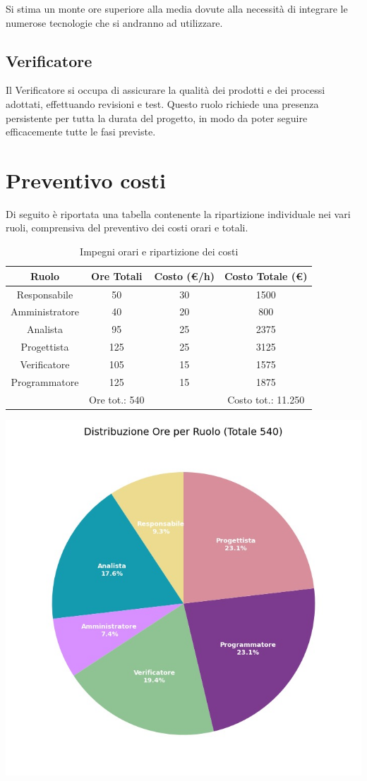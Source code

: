 \documentclass{article}
\begin{document}
		Si stima un monte ore superiore alla media dovute alla necessità di integrare le numerose tecnologie che si andranno ad utilizzare.
		\subsection{Verificatore}
		Il Verificatore si occupa di assicurare la qualità dei prodotti e dei processi adottati, effettuando revisioni e test. 
		Questo ruolo richiede una presenza persistente per tutta la durata del progetto, in modo da poter seguire efficacemente tutte le fasi previste.
		
	
	\section{Preventivo costi}
	Di seguito è riportata una tabella contenente la ripartizione individuale nei vari ruoli, comprensiva del preventivo dei costi orari e totali.
	\begin{table}[h!]
	\centering
	\begin{tabular}{|c|c|c|c|}
	\hline
	\rowcolor{gray!25}
	Ruolo & Ore Totali & Costo (€/h) & Costo Totale (€) \\ \hline
	Responsabile & 50 & 30 & 1500 \\ \hline
	Amministratore & 40 & 20 & 800 \\ \hline
	Analista & 95 & 25 & 2375\\ \hline
	Progettista & 125 & 25 & 3125 \\ \hline
	Verificatore &  105 & 15 & 1575 \\ \hline
	Programmatore &  125 & 15 & 1875 \\ \hline
	\rowcolor{gray!25}
	& Ore tot.: 540  &  & Costo tot.: 11.250 \\ \hline
	\end{tabular}
	\caption{Impegni orari e ripartizione dei costi}
	\end{table}
	\FloatBarrier
	\includegraphics[width=1.0\textwidth]{grafico_costi.jpeg}
\end{document}
